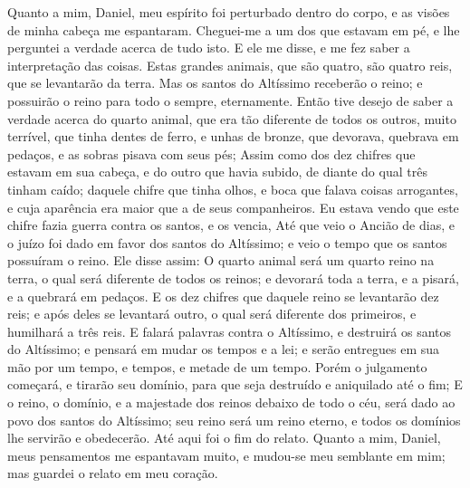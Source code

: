 {Quanto a mim, Daniel, meu espírito foi perturbado dentro do corpo, e as visões de minha cabeça me espantaram.
Cheguei-me a um dos que estavam em pé, e lhe perguntei a verdade acerca de tudo isto. E ele me disse, e me fez saber a interpretação das coisas.
Estas grandes animais, que são quatro, são quatro reis, que se levantarão da terra.
Mas os santos do Altíssimo receberão o reino; e possuirão o reino para todo o sempre, eternamente.
Então tive desejo de saber a verdade acerca do quarto animal, que era tão diferente de todos os outros, muito terrível, que tinha dentes de ferro, e unhas de bronze, que devorava, quebrava em pedaços, e as sobras pisava com seus pés;
Assim como dos dez chifres que estavam em sua cabeça, e do outro que havia subido, de diante do qual três tinham caído; daquele chifre que tinha olhos, e boca que falava coisas arrogantes, e cuja aparência era maior que a de seus companheiros.
Eu estava vendo que este chifre fazia guerra contra os santos, e os vencia,
Até que veio o Ancião de dias, e o juízo foi dado em favor dos santos do Altíssimo; e veio o tempo que os santos possuíram o reino.
Ele disse assim: O quarto animal será um quarto reino na terra, o qual será diferente de todos os reinos; e devorará toda a terra, e a pisará, e a quebrará em pedaços.
E os dez chifres
{} que daquele reino se levantarão dez reis; e após deles se levantará outro, o qual será diferente dos primeiros, e humilhará a três reis.
E falará palavras contra o Altíssimo, e destruirá os santos do Altíssimo; e pensará em mudar os tempos e a lei; e serão entregues em sua mão por um tempo, e tempos, e metade de um tempo.
Porém o julgamento começará, e tirarão seu domínio, para que seja destruído e aniquilado até o fim;
E o reino, o domínio, e a majestade dos reinos debaixo de todo o céu, será dado ao povo dos santos do Altíssimo; seu reino será um reino eterno, e todos os domínios lhe servirão e obedecerão.
Até aqui foi o fim do relato. Quanto a mim, Daniel, meus pensamentos me espantavam muito, e mudou-se meu semblante em mim; mas guardei o relato em meu coração.

\par }

